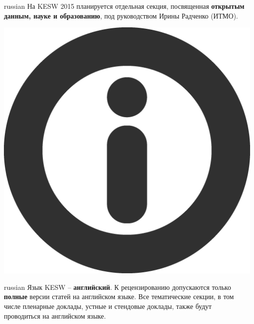 \documentclass[a4paper, 10pt]{article}
\renewcommand{\skip}{\vspace{1ex}}
\begin{document}
\skip\skip

\begin{otherlanguage*}{russian}
\noindent 
На KESW 2015 планируется отдельная секция, посвященная \textbf{открытым данным,
науке и образованию}, под руководством  Ирины Радченко (ИТМО). 
\end{otherlanguage*}

\skip\skip

\begin{minipage}{.10\textwidth}
\includegraphics[width=\textwidth]{information}
\end{minipage}
\hfill
\begin{minipage}{.82\textwidth}
\begin{otherlanguage*}{russian}
\noindent Язык KESW -- \textbf{английский}. 
К рецензированию допускаются только \textbf{полные} версии статей на английском языке.
Все тематические секции, в том числе пленарные доклады, устные и стендовые доклады, также будут проводиться на английском языке.
\end{otherlanguage*}
\end{minipage}

\skip\skip
\end{document}
